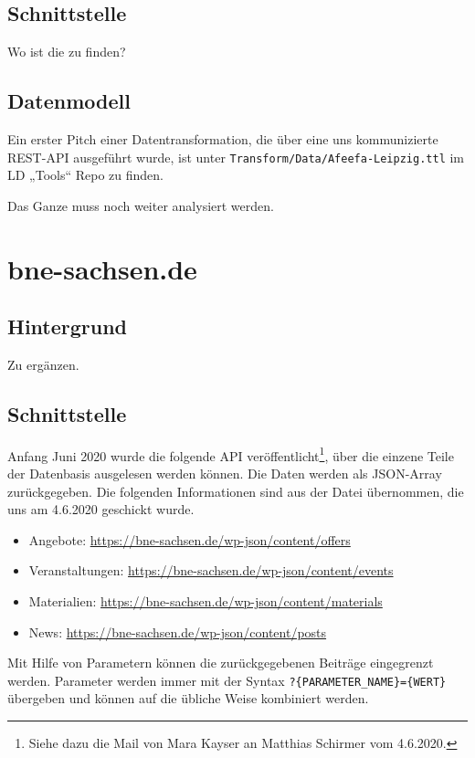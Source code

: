 \documentclass[a4paper,11pt]{article}
\begin{document}
\subsection{Schnittstelle}

Wo ist die zu finden? 

\subsection{Datenmodell}
Ein erster Pitch einer Datentransformation, die über eine uns kommunizierte
REST-API ausgeführt wurde, ist unter \texttt{Transform/Data/Afeefa-Leipzig.ttl}
im LD „Tools“ Repo zu finden.

Das Ganze muss noch weiter analysiert werden. 

\section{bne-sachsen.de}

\subsection{Hintergrund}

Zu ergänzen.

\subsection{Schnittstelle}
Anfang Juni 2020 wurde die folgende API veröffentlicht\footnote{Siehe dazu die
  Mail von Mara Kayser an Matthias Schirmer vom 4.6.2020.}, über die einzene
Teile der Datenbasis ausgelesen werden können.  Die Daten werden als
JSON-Array zurückgegeben. Die folgenden Informationen sind aus der Datei
übernommen, die uns am 4.6.2020 geschickt wurde. 
\begin{itemize}
  \item Angebote: \url{https://bne-sachsen.de/wp-json/content/offers}
  \item Veranstaltungen: \url{https://bne-sachsen.de/wp-json/content/events}
  \item Materialien: \url{https://bne-sachsen.de/wp-json/content/materials}
  \item News: \url{https://bne-sachsen.de/wp-json/content/posts}
\end{itemize}
Mit Hilfe von Parametern können die zurückgegebenen Beiträge eingegrenzt
werden.  Parameter werden immer mit der Syntax
\texttt{?\{PARAMETER\_NAME\}=\{WERT\}} übergeben und können auf die übliche
Weise kombiniert werden.
\end{document}
